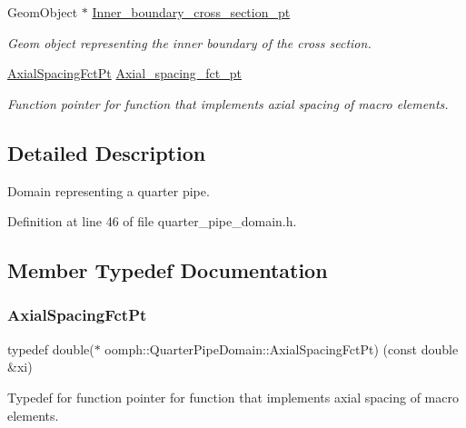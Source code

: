 \begin{DoxyCompactItemize}
Geom\+Object $\ast$ \hyperlink{classoomph_1_1QuarterPipeDomain_a2760038e136d58a41dcbcd045bd13ae4}{Inner\+\_\+boundary\+\_\+cross\+\_\+section\+\_\+pt}
\begin{DoxyCompactList}\small\item\em Geom object representing the inner boundary of the cross section. \end{DoxyCompactList}\item 
\hyperlink{classoomph_1_1QuarterPipeDomain_a540d441b38146aacb12938d5f885789c}{Axial\+Spacing\+Fct\+Pt} \hyperlink{classoomph_1_1QuarterPipeDomain_ada15e8a576d3715e8ed88ea9bef5508a}{Axial\+\_\+spacing\+\_\+fct\+\_\+pt}
\begin{DoxyCompactList}\small\item\em Function pointer for function that implements axial spacing of macro elements. \end{DoxyCompactList}\end{DoxyCompactItemize}


\subsection{Detailed Description}
Domain representing a quarter pipe. 

Definition at line 46 of file quarter\+\_\+pipe\+\_\+domain.\+h.



\subsection{Member Typedef Documentation}
\mbox{\label{classoomph_1_1QuarterPipeDomain_a540d441b38146aacb12938d5f885789c}} 
\subsubsection{\texorpdfstring{Axial\+Spacing\+Fct\+Pt}{AxialSpacingFctPt}}
{\footnotesize\ttfamily typedef double($\ast$ oomph\+::\+Quarter\+Pipe\+Domain\+::\+Axial\+Spacing\+Fct\+Pt) (const double \&xi)}



Typedef for function pointer for function that implements axial spacing of macro elements. 



